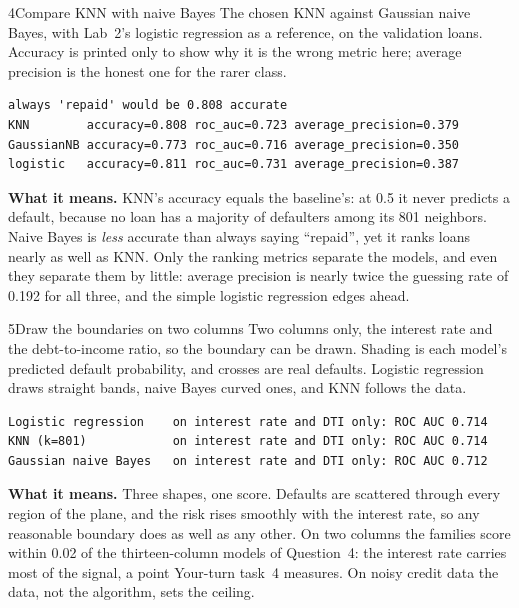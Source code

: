 \begin{labquestion}{4}{Compare KNN with naive Bayes}
The chosen KNN against Gaussian naive Bayes, with Lab~2's logistic regression as a reference, on the validation loans. Accuracy is printed only to show why it is the wrong metric here; average precision is the honest one for the rarer class.
\end{labquestion}
\begin{labanswer}

\begin{refoutput}
\begin{lstlisting}[style=utpterminal]
always 'repaid' would be 0.808 accurate
KNN        accuracy=0.808 roc_auc=0.723 average_precision=0.379
GaussianNB accuracy=0.773 roc_auc=0.716 average_precision=0.350
logistic   accuracy=0.811 roc_auc=0.731 average_precision=0.387
\end{lstlisting}
\end{refoutput}

\textbf{What it means.} KNN's accuracy equals the baseline's: at 0.5 it never predicts a default, because no loan has a majority of defaulters among its 801 neighbors. Naive Bayes is \emph{less} accurate than always saying ``repaid'', yet it ranks loans nearly as well as KNN. Only the ranking metrics separate the models, and even they separate them by little: average precision is nearly twice the guessing rate of 0.192 for all three, and the simple logistic regression edges ahead.
\end{labanswer}

\begin{labquestion}{5}{Draw the boundaries on two columns}
Two columns only, the interest rate and the debt-to-income ratio, so the boundary can be drawn. Shading is each model's predicted default probability, and crosses are real defaults. Logistic regression draws straight bands, naive Bayes curved ones, and KNN follows the data.
\end{labquestion}
\begin{labanswer}

\begin{refoutput}
\begin{lstlisting}[style=utpterminal]
Logistic regression    on interest rate and DTI only: ROC AUC 0.714
KNN (k=801)            on interest rate and DTI only: ROC AUC 0.714
Gaussian naive Bayes   on interest rate and DTI only: ROC AUC 0.712
\end{lstlisting}
\end{refoutput}

\textbf{What it means.} Three shapes, one score. Defaults are scattered through every region of the plane, and the risk rises smoothly with the interest rate, so any reasonable boundary does as well as any other. On two columns the families score within 0.02 of the thirteen-column models of Question~4: the interest rate carries most of the signal, a point Your-turn task~4 measures. On noisy credit data the data, not the algorithm, sets the ceiling.
\end{labanswer}

